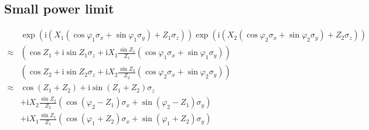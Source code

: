 \documentclass[10pt,fleqn]{article}
\newcommand{\ui}{\mathrm{i}}
\newcommand{\eqar}[1]
{
  \begin{align*}
    #1
  \end{align*}
}
\newcommand{\paren}[1]{{\left({#1}\right)}}
\begin{document}
\subsection{Small power limit}
\eqar{
  &\exp\paren{\ui\paren{X_1\paren{\cos\varphi_1\sigma_x+\sin\varphi_1\sigma_y}+Z_1\sigma_z}}\exp\paren{\ui\paren{X_2\paren{\cos\varphi_2\sigma_x+\sin\varphi_2\sigma_y}+Z_2\sigma_z}}\\
  \approx&\paren{\cos Z_1+\ui\sin Z_1\sigma_z+\ui X_1\frac{\sin Z_1}{Z_1}\paren{\cos\varphi_1\sigma_x+\sin\varphi_1\sigma_y}}\\
  &\paren{\cos Z_2+\ui\sin Z_2\sigma_z+\ui X_2\frac{\sin Z_2}{Z_2}\paren{\cos\varphi_2\sigma_x+\sin\varphi_2\sigma_y}}\\
  \approx&
  \cos\paren{Z_1+Z_2}+\ui\sin\paren{Z_1+Z_2}\sigma_z
  \\
  &
  +\ui X_2\frac{\sin Z_2}{Z_2}\paren{
    \cos\paren{\varphi_2-Z_1}\sigma_x
    +\sin\paren{\varphi_2-Z_1}\sigma_y
  }
  \\
  &+\ui X_1\frac{\sin Z_1}{Z_1}
  \paren{\cos\paren{\varphi_1+Z_2}\sigma_x+\sin\paren{\varphi_1+Z_2}\sigma_y}
  \\
}
\end{document}

